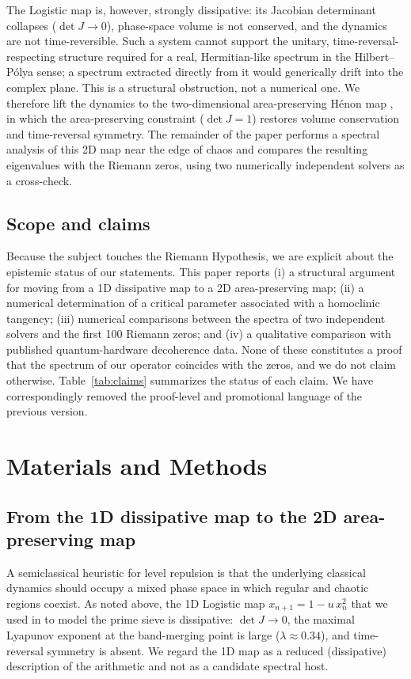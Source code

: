 \documentclass[utf8]{FrontiersinHarvard}
\begin{document}
The Logistic map is, however, strongly dissipative: its Jacobian determinant collapses ($\det J \to 0$), phase-space volume is not conserved, and the dynamics are not time-reversible. Such a system cannot support the unitary, time-reversal-respecting structure required for a real, Hermitian-like spectrum in the Hilbert--P\'olya sense; a spectrum extracted directly from it would generically drift into the complex plane. This is a structural obstruction, not a numerical one. We therefore lift the dynamics to the two-dimensional area-preserving H\'enon map \citep{henon1969}, in which the area-preserving constraint ($\det J = 1$) restores volume conservation and time-reversal symmetry. The remainder of the paper performs a spectral analysis of this 2D map near the edge of chaos and compares the resulting eigenvalues with the Riemann zeros, using two numerically independent solvers as a cross-check.

\subsection{Scope and claims}

Because the subject touches the Riemann Hypothesis, we are explicit about the epistemic status of our statements. This paper reports (i) a structural argument for moving from a 1D dissipative map to a 2D area-preserving map; (ii) a numerical determination of a critical parameter associated with a homoclinic tangency; (iii) numerical comparisons between the spectra of two independent solvers and the first 100 Riemann zeros; and (iv) a qualitative comparison with published quantum-hardware decoherence data. None of these constitutes a proof that the spectrum of our operator coincides with the zeros, and we do not claim otherwise. Table~\ref{tab:claims} summarizes the status of each claim. We have correspondingly removed the proof-level and promotional language of the previous version.

\section{Materials and Methods}

\subsection{From the 1D dissipative map to the 2D area-preserving map}

A semiclassical heuristic for level repulsion is that the underlying classical dynamics should occupy a mixed phase space in which regular and chaotic regions coexist. As noted above, the 1D Logistic map $x_{n+1} = 1 - u\,x_n^2$ that we used in \citet{wang2026} to model the prime sieve is dissipative: $\det J \to 0$, the maximal Lyapunov exponent at the band-merging point is large ($\lambda \approx 0.34$), and time-reversal symmetry is absent. We regard the 1D map as a reduced (dissipative) description of the arithmetic and not as a candidate spectral host.
\end{document}
